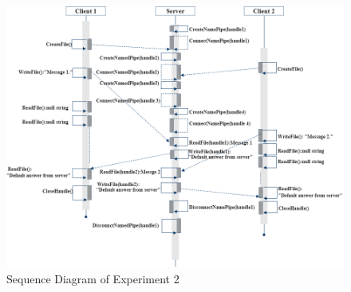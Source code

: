 \begin{figure}[H]
\centerline{\includegraphics[scale=0.55]{Figures/exp2}}
 \caption{Sequence Diagram of Experiment 2}
\label{exp2}
\end{figure}


